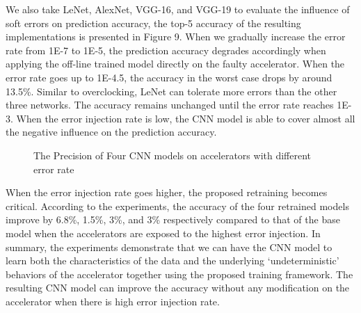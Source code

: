   We also take LeNet, AlexNet, VGG-16, and VGG-19 to evaluate the influence of soft errors on prediction accuracy,
the top-5 accuracy of the resulting implementations is presented in Figure 9. When we gradually 
increase the error rate from 1E-7 to 1E-5, the prediction accuracy degrades accordingly when applying the off-line 
trained model directly on the faulty accelerator. When the error rate goes up to 1E-4.5, 
the accuracy in the worst case drops by around 13.5\%. Similar to overclocking, LeNet can tolerate 
more errors than the other three networks. The accuracy remains unchanged until the error rate reaches 1E-3. 
When the error injection rate is low, the CNN model is able to cover almost all the negative influence 
on the prediction accuracy.

\begin{figure*}
        \center
        \qquad
        \qquad
        \qquad
        \caption{The Precision of Four CNN models on accelerators with different error rate}
        \label{fig:softerror accuracy}
\end{figure*}


  When the error injection rate goes higher, the proposed retraining becomes critical. 
According to the experiments, the accuracy of the four retrained models improve by 6.8\%, 1.5\%, 3\%, and 3\% 
respectively compared to that of the base model when the accelerators are exposed to the highest 
error injection. In summary, the experiments demonstrate that we can have the CNN model to learn 
both the characteristics of the data and the underlying ‘undeterministic’ behaviors of the accelerator 
together using the proposed training framework. The resulting CNN model can improve the accuracy 
without any modification on the accelerator when there is high error injection rate.  



